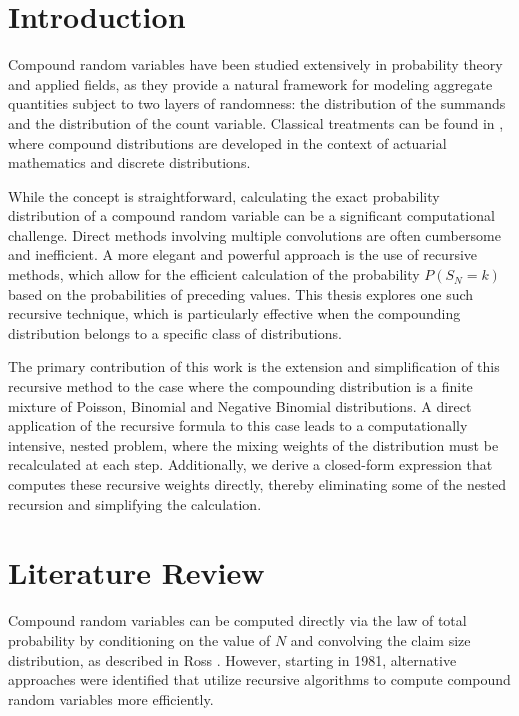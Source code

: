 \documentclass[11pt]{amsart}
\theoremstyle{definition}
\theoremstyle{plain}
\begin{document}
\tableofcontents
\newpage

\section{Introduction}

Compound random variables have been studied extensively in probability theory and applied
fields, as they provide a natural framework for modeling aggregate quantities subject to two
layers of randomness: the distribution of the summands and the distribution of the count
variable. Classical treatments can be found in
\cite{ross2010,pekoz-ross},
where compound distributions are developed in the context of actuarial mathematics and
discrete distributions.

While the concept is straightforward, calculating the exact probability distribution of a
compound random variable can be a significant computational challenge.  Direct methods
involving multiple convolutions are often cumbersome and inefficient.  A more elegant and
powerful approach is the use of recursive methods, which allow for the efficient calculation
of the probability $P(S_N = k)$ based on the probabilities of preceding values.  This
thesis explores one such recursive technique, which is particularly effective when the
compounding distribution belongs to a specific class of distributions.

The primary contribution of this work is the extension and simplification of this recursive
method to the case where the compounding distribution is a finite mixture of Poisson,
Binomial and Negative Binomial distributions.  A direct application of the recursive formula
to this case leads to a computationally intensive, nested problem, where the mixing weights
of the distribution must be recalculated at each step.  Additionally, we derive a
closed-form expression that computes these recursive weights directly, thereby eliminating
some of the nested recursion and simplifying the calculation.

\section{Literature Review}

Compound random variables can be computed directly via the law of total probability by
conditioning on the value of $N$ and convolving the claim size distribution, as described in
Ross \cite{ross2010}. However, starting in 1981, alternative approaches were identified that
utilize recursive algorithms to compute compound random variables more efficiently.
\end{document}
